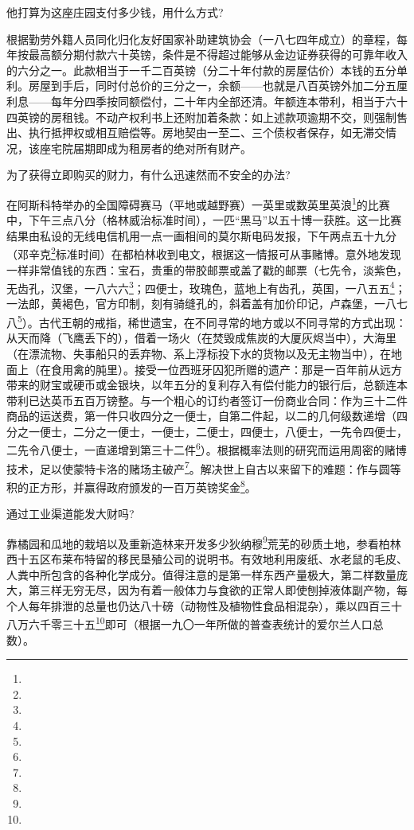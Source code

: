 \par 他打算为这座庄园支付多少钱，用什么方式?
\par 根据勤劳外籍人员同化归化友好国家补助建筑协会（一八七四年成立）的章程，每年按最高额分期付款六十英镑，条件是不得超过能够从金边证券获得的可靠年收入的六分之一。此款相当于一千二百英镑（分二十年付款的房屋估价）本钱的五分单利。房屋到手后，同时付总价的三分之一，余额——也就是八百英镑外加二分五厘利息——每年分四季按同额偿付，二十年内全部还清。年额连本带利，相当于六十四英镑的房租钱。不动产权利书上还附加着条款：如上述款项逾期不交，则强制售出、执行抵押权或相互赔偿等。房地契由一至二、三个债权者保存，如无滞交情况，该座宅院届期即成为租房者的绝对所有财产。
\par 为了获得立即购买的财力，有什么迅速然而不安全的办法?
\par 在阿斯科特举办的全国障碍赛马（平地或越野赛）一英里或数英里英浪\footnote{}的比赛中，下午三点八分（格林威治标准时间），一匹“黑马”以五十博一获胜。这一比赛结果由私设的无线电信机用一点一画相间的莫尔斯电码发报，下午两点五十九分（邓辛克\footnote{}标准时间）在都柏林收到电文，根据这一情报可从事赌博。意外地发现一样非常值钱的东西：宝石，贵重的带胶邮票或盖了戳的邮票（七先令，淡紫色，无齿孔，汉堡，一八六六\footnote{}；四便士，玫瑰色，蓝地上有齿孔，英国，一八五五\footnote{}；一法郎，黄褐色，官方印制，刻有骑缝孔的，斜着盖有加价印记，卢森堡，一八七八\footnote{}）。古代王朝的戒指，稀世遗宝，在不同寻常的地方或以不同寻常的方式出现：从天而降（飞鹰丢下的），借着一场火（在焚毁成焦炭的大厦灰烬当中），大海里（在漂流物、失事船只的丢弃物、系上浮标投下水的货物以及无主物当中），在地面上（在食用禽的肫里）。接受一位西班牙囚犯所赠的遗产：那是一百年前从远方带来的财宝或硬币或金银块，以年五分的复利存入有偿付能力的银行后，总额连本带利已达英币五百万镑整。与一个粗心的订约者签订一份商业合同：作为三十二件商品的运送费，第一件只收四分之一便士，自第二件起，以二的几何级数递增（四分之一便士，二分之一便士，一便士，二便士，四便士，八便士，一先令四便士，二先令八便士，一直递增到第三十二件\footnote{}）。根据概率法则的研究而运用周密的赌博技术，足以使蒙特卡洛的赌场主破产\footnote{}。解决世上自古以来留下的难题：作与圆等积的正方形，并赢得政府颁发的一百万英镑奖金\footnote{}。
\par 通过工业渠道能发大财吗?
\par 靠橘园和瓜地的栽培以及重新造林来开发多少狄纳穆\footnote{}荒芜的砂质土地，参看柏林西十五区布莱布特留的移民垦殖公司的说明书。有效地利用废纸、水老鼠的毛皮、人粪中所包含的各种化学成分。值得注意的是第一样东西产量极大，第二样数量庞大，第三样无穷无尽，因为有着一般体力与食欲的正常人即使刨掉液体副产物，每个人每年排泄的总量也仍达八十磅（动物性及植物性食品相混杂），乘以四百三十八万六千零三十五\footnote{}即可（根据一九〇一年所做的普查表统计的爱尔兰人口总数）。
